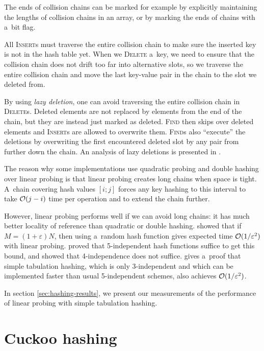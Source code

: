 The ends of collision chains can be marked for example by explicitly maintaining
the lengths of collision chains in an array, or by marking the ends of chains
with a~bit flag.

All \textsc{Insert}s must traverse the entire collision chain to make sure
the inserted key is not in the hash table yet.
When we \textsc{Delete} a~key, we need to ensure that the collision chain
does not drift too far into alternative slots, so we traverse the entire
collision chain and move the last key-value pair in the chain to the slot
we deleted from.

By using \emph{lazy deletion}, one can avoid traversing the entire collision
chain in \textsc{Delete}s. Deleted elements are not replaced by elements from
the end of the chain, but they are instead just marked as deleted.
\textsc{Find} then skips over deleted elements and \textsc{Insert}s are allowed
to overwrite them.  \textsc{Find}s also ``execute'' the deletions by
overwriting the first encountered deleted slot by any pair from further down
the chain. An analysis of lazy deletions is presented in \cite{lazy-deletions}.

The reason why some implementations use quadratic probing and double hashing
over linear probing is that linear probing creates long chains when space is
tight. A~chain covering hash values $[i;j]$ forces any key hashing to this
interval to take $\mathcal{O}(j-i)$ time per operation and to extend the chain further.

However, linear probing performs well if we can avoid long chains: it has
much better locality of reference than quadratic or double hashing.
\cite{knuth-linear} showed that if $M=(1+\varepsilon) N$, then using a~random
hash function gives expected time $\mathcal{O}(1/\varepsilon^2)$ with linear probing.
\cite{linear-probing-ci} proved that 5-independent hash functions suffice
to get this bound, and \cite{linear-probing-constant} showed that
4-independence does not suffice.
\cite{power-of-simple-tab} gives a~proof that simple tabulation hashing,
which is only 3-independent and which can be implemented faster than usual
5-independent schemes, also achieves $\mathcal{O}(1/\varepsilon^2)$.

In section \ref{sec:hashing-results}, we present our measurements of the
performance of linear probing with simple tabulation hashing.

\section{Cuckoo hashing}
\label{sec:cuckoo}

